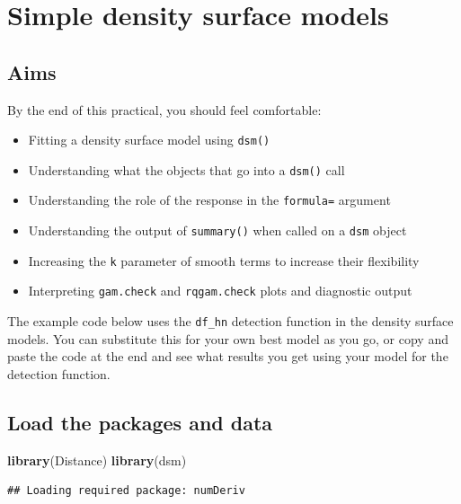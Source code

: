\documentclass[]{book}
\newenvironment{Shaded}{\begin{snugshade}}{\end{snugshade}}
\newcommand{\KeywordTok}[1]{\textcolor[rgb]{0.13,0.29,0.53}{\textbf{#1}}}
\newcommand{\NormalTok}[1]{#1}
\providecommand{\tightlist}{%
  \setlength{\itemsep}{0pt}\setlength{\parskip}{0pt}}
\theoremstyle{definition}
\theoremstyle{definition}
\theoremstyle{remark}
\begin{document}
\chapter{Simple density surface
models}\label{simple-density-surface-models}

\section{Aims}\label{aims-2}

By the end of this practical, you should feel comfortable:

\begin{itemize}
\tightlist
\item
  Fitting a density surface model using \texttt{dsm()}
\item
  Understanding what the objects that go into a \texttt{dsm()} call
\item
  Understanding the role of the response in the \texttt{formula=}
  argument
\item
  Understanding the output of \texttt{summary()} when called on a
  \texttt{dsm} object
\item
  Increasing the \texttt{k} parameter of smooth terms to increase their
  flexibility
\item
  Interpreting \texttt{gam.check} and \texttt{rqgam.check} plots and
  diagnostic output
\end{itemize}

The example code below uses the \texttt{df\_hn} detection function in
the density surface models. You can substitute this for your own best
model as you go, or copy and paste the code at the end and see what
results you get using your model for the detection function.

\section{Load the packages and data}\label{load-the-packages-and-data}

\begin{Shaded}
\begin{Highlighting}[]
\KeywordTok{library}\NormalTok{(Distance)}
\KeywordTok{library}\NormalTok{(dsm)}
\end{Highlighting}
\end{Shaded}

\begin{verbatim}
## Loading required package: numDeriv
\end{verbatim}
\end{document}
